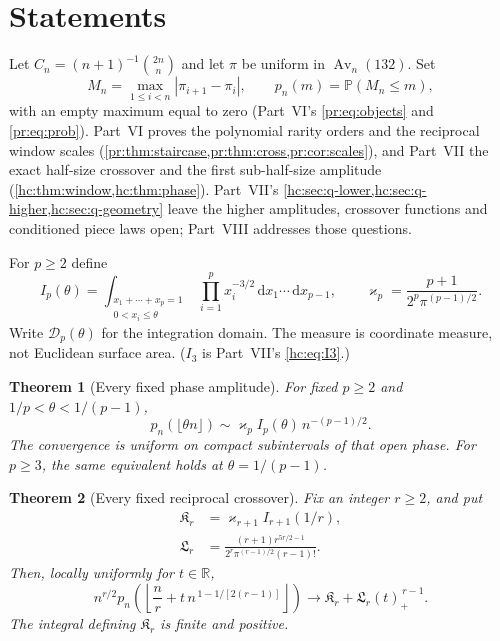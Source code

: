 \documentclass[11pt,a4paper]{article}
\newtheorem{theorem}{Theorem}[section]
\theoremstyle{definition}\newaliascnt{definition}{theorem}
\theoremstyle{remark}\newaliascnt{remark}{theorem}
\newcommand{\Av}{\operatorname{Av}}
\newcommand{\R}{\mathbb R}
\newcommand{\dd}{\mathrm d}
\newcommand{\ljP}{\mathbb P}
\newcommand{\prpos}[1]{(#1)_+}
\begin{document}
\section{Statements}
\label{gc:sec:results}
Let $C_n=(n+1)^{-1}\binom{2n}{n}$ and let $\pi$ be uniform in $\Av_n(132)$. Set
\[
 M_n=\max_{1\le i<n}|\pi_{i+1}-\pi_i|,
 \qquad p_n(m)=\ljP(M_n\le m),
\]
with an empty maximum equal to zero (Part~VI's \eqref{pr:eq:objects} and
\eqref{pr:eq:prob}). Part~VI proves the polynomial rarity orders and the
reciprocal window scales (\cref{pr:thm:staircase,pr:thm:cross,pr:cor:scales}),
and Part~VII the exact half-size crossover and the first sub-half-size
amplitude (\cref{hc:thm:window,hc:thm:phase}). Part~VII's
\cref{hc:sec:q-lower,hc:sec:q-higher,hc:sec:q-geometry} leave the higher
amplitudes, crossover functions and conditioned piece laws open; Part~VIII
addresses those questions.

For $p\ge2$ define
\begin{equation}\label{gc:eq:integral}
 I_p(\theta)=
 \int_{\substack{x_1+\cdots+x_p=1\\0<x_i\le\theta}}
       \prod_{i=1}^p x_i^{-3/2}\,\dd x_1\cdots\,\dd x_{p-1},
 \qquad \varkappa_p=\frac{p+1}{2^p\pi^{(p-1)/2}}.
\end{equation}
Write $\mathcal D_p(\theta)$ for the integration domain. The measure is
coordinate measure, not Euclidean surface area. ($I_3$ is Part~VII's
\eqref{hc:eq:I3}.)

\begin{theorem}[Every fixed phase amplitude]\label{gc:thm:phase}
For fixed $p\ge2$ and $1/p<\theta<1/(p-1)$,
\begin{equation}\label{gc:eq:phase}
 p_n(\lfloor\theta n\rfloor)
 \sim\varkappa_pI_p(\theta)\,n^{-(p-1)/2}.
\end{equation}
The convergence is uniform on compact subintervals of that open phase. For
$p\ge3$, the same equivalent holds at $\theta=1/(p-1)$.
\end{theorem}

\begin{theorem}[Every fixed reciprocal crossover]\label{gc:thm:window}
Fix an integer $r\ge2$, and put
\begin{align}
 \mathfrak K_r&=\varkappa_{r+1}I_{r+1}(1/r),\label{gc:eq:B}\\
 \mathfrak L_r&=\frac{(r+1)r^{5r/2-1}}
             {2^r\pi^{(r-1)/2}(r-1)!}.\label{gc:eq:A}
\end{align}
Then, locally uniformly for $t\in\R$,
\begin{equation}\label{gc:eq:window}
 n^{r/2}p_n\!\left(
   \left\lfloor\frac nr+t\,n^{\,1-1/[2(r-1)]}\right\rfloor\right)
 \longrightarrow\mathfrak K_r+\mathfrak L_r\prpos t^{\,r-1}.
\end{equation}
The integral defining $\mathfrak K_r$ is finite and positive.
\end{theorem}
\end{document}
